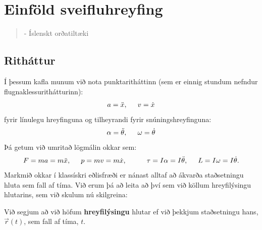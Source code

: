 \ifdefined \wholebook \else\documentclass[oneside]{book}\usepackage{EdlBook}\graphicspath{{figures/}}
\begin{document}
%
\setcounter{chapter}{10} %
%
\fi

\renewcommand{\thefigure}{\arabic{figure}}


\chapter{Einföld sveifluhreyfing}

\begin{quote}
    \textit{}
    \begin{flushright}
    - Íslenskt orðatiltæki
    \end{flushright}
\end{quote}


\section{Ritháttur}

Í þessum kafla munum við nota punktaritháttinn (sem er einnig stundum nefndur flugnaklessurithátturinn):
\begin{align*}
    a = \Ddot{x}, \hspace{0.5cm} v = \dot{x}
\end{align*}
fyrir línulegu hreyfinguna og tilheyrandi fyrir snúningshreyfinguna:
\begin{align*}
    \alpha = \Ddot{\theta}, \hspace{0.5cm} \omega = \dot{\theta}
\end{align*}
Þá getum við umritað lögmálin okkar sem:
\begin{align*}
    F = ma = m \Ddot{x}, \hspace{0.5cm} p = mv = m\dot{x}, \hspace{1cm} \tau = I\alpha = I\Ddot{\theta}, \hspace{0.5cm} L = I\omega = I\dot{\theta}.
\end{align*}
Markmið okkar í klassískri eðlisfræði er nánast alltaf að ákvarða staðsetningu hluta sem fall af tíma. Við erum þá að leita að því sem við köllum hreyfilýsingu hlutarins, sem við skulum nú skilgreina:

\begin{tcolorbox}
\begin{definition}
Við segjum að við höfum \textbf{hreyfilýsingu} hlutar ef við þekkjum staðsetningu hans, $\Vec{r}(t)$, sem fall af tíma, $t$.
\end{definition}
\end{tcolorbox}
\end{document}

